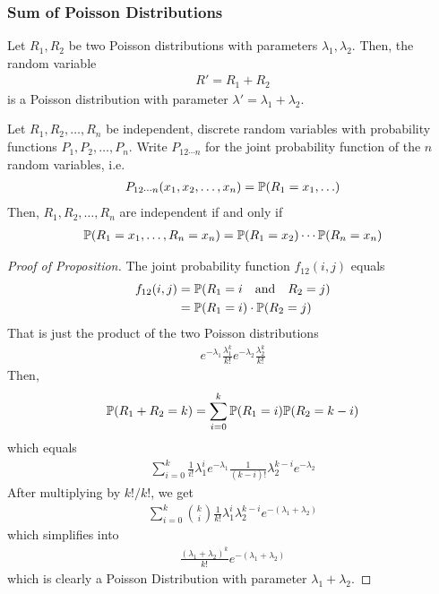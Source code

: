 \subsubsection{Sum of Poisson Distributions}
\begin{proposition}
    Let $R_1,R_2$ be two Poisson distributions with parameters $\lambda_1,\lambda_2$. Then, the random variable
    \begin{align}
        R' = R_1 + R_2
    \end{align}
    is a Poisson distribution with parameter $\lambda' = \lambda_1+\lambda_2$.
\end{proposition}
\begin{lemma}
    Let $R_1,R_2, \ldots, R_n$ be independent, discrete random variables with probability functions $P_1, P_2, \ldots, P_n$. Write $P_{12\cdots n}$ for the joint probability function of the $n$ random variables, i.e.
    \begin{align}
        P_{12\cdots n}(x_1, x_2, \ldots, x_n) = \mathbb{P}(R_1 = x_1, \ldots)
    \end{align}
    Then, $R_1, R_2, \ldots, R_n$ are independent if and only if
    \begin{align}
        \mathbb{P}(R_1 = x_1, \ldots, R_n = x_n) = \mathbb{P}(R_1 = x_2) \cdots \mathbb{P}(R_n = x_n)
    \end{align}
\end{lemma}
\begin{proof}[Proof of Proposition]
    The joint probability function $f_{12}(i,j)$ equals
    \begin{align}
        f_{12}(i,j) &= \probability(R_1 = i \qand R_2 = j)\\
        &= \probability(R_1 = i) \cdot \probability(R_2 = j)
    \end{align}
    That is just the product of the two Poisson distributions
    \begin{align}
        e^{-\lambda_1} \frac{\lambda_1^k}{k!} e^{-\lambda_2} \frac{\lambda_2^k}{k!}
    \end{align}
    Then,
    \begin{align}
        \mathbb{P}(R_1 + R_2 = k) = \sum_{i = 0}^k \mathbb{P}(R_1 = i)\mathbb{P}(R_2 = k - i)
    \end{align}
    which equals
    \begin{align}
        \sum_{i = 0}^k \frac{1}{i!}\lambda_1^i e^{-\lambda_1} \frac{1}{(k-i)!} \lambda_2^{k-i} e^{-\lambda_2}
    \end{align}
    After multiplying by $k!/k!$, we get
    \begin{align}
        \sum_{i = 0}^k \binom{k}{i} \frac{1}{k!} \lambda_1^i \lambda_2^{k-i} e^{-(\lambda_1 + \lambda_2)}
    \end{align}
    which simplifies into
    \begin{align}
        \frac{(\lambda_1 + \lambda_2)^k}{k!} e^{-(\lambda_1 + \lambda_2)}
    \end{align}
    which is clearly a Poisson Distribution with parameter $\lambda_1 + \lambda_2$.
\end{proof}
